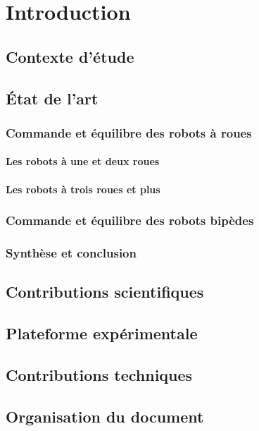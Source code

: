\chapter{Introduction}
	\section{Contexte d'étude}
	\section{État de l'art}
		\subsection{Commande et équilibre des robots à roues}
			\subsubsection{Les robots à une et deux roues}
			\subsubsection{Les robots à trois roues et plus}
		\subsection{Commande et équilibre des robots bipèdes}
		\subsection{Synthèse et conclusion}

	\section{Contributions scientifiques}
	\section{Plateforme expérimentale}
	\section{Contributions techniques}
	\section{Organisation du document}